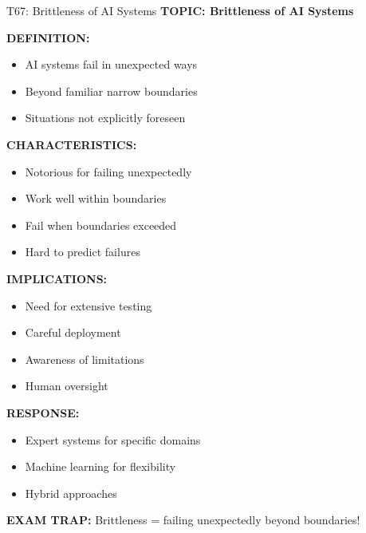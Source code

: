 \documentclass[8pt]{beamer}
\begin{document}
	\begin{frame}{T67: Brittleness of AI Systems}
		\fontsize{6.5}{7.5}\selectfont
		\textbf{TOPIC: Brittleness of AI Systems}
		
		\vspace{0.1cm}
		\textbf{DEFINITION:}
		\begin{itemize}
			\item AI systems fail in unexpected ways
			\item Beyond familiar narrow boundaries
			\item Situations not explicitly foreseen
		\end{itemize}
		
		\vspace{0.1cm}
		\textbf{CHARACTERISTICS:}
		\begin{itemize}
			\item Notorious for failing unexpectedly
			\item Work well within boundaries
			\item Fail when boundaries exceeded
			\item Hard to predict failures
		\end{itemize}
		
		\vspace{0.1cm}
		\textbf{IMPLICATIONS:}
		\begin{itemize}
			\item Need for extensive testing
			\item Careful deployment
			\item Awareness of limitations
			\item Human oversight
		\end{itemize}
		
		\vspace{0.1cm}
		\textbf{RESPONSE:}
		\begin{itemize}
			\item Expert systems for specific domains
			\item Machine learning for flexibility
			\item Hybrid approaches
		\end{itemize}
		
		\textcolor{myred}{\textbf{EXAM TRAP:}} Brittleness = \textcolor{myblue}{failing unexpectedly beyond boundaries}!
	\end{frame}
	
\end{document}
